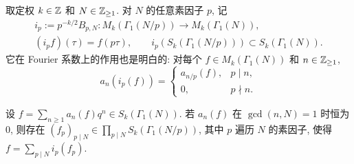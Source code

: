取定权 $k \in \mathbb{Z}$ 和 $N \in \mathbb{Z}_{\geq 1}$. 对 $N$ 的任意素因子 $p$, 记
\begin{gather*}
	i_p := p^{-k/2} B_{p,N}: M_k(\Gamma_1(N/p)) \to M_k(\Gamma_1(N)), \\
	(i_p f)(\tau) = f(p\tau), \qquad i_p\left( S_k(\Gamma_1(N/p)) \right) \subset S_k(\Gamma_1(N)).
\end{gather*}
它在 Fourier 系数上的作用也是明白的: 对每个 $f \in M_k(\Gamma_1(N))$ 和 $n \in \mathbb{Z}_{\geq 1}$,
\[ a_n(i_p(f)) = \begin{cases} a_{n/p}(f), & p \mid n, \\ 0, & p \nmid n. \end{cases} \]

\begin{theorem}\label{prop:oldform-decomp}
	设 $f = \sum_{n \geq 1} a_n(f) q^n \in S_k(\Gamma_1(N))$. 若 $a_n(f)$ 在 $\gcd(n, N) = 1$ 时恒为 $0$, 则存在 $(f_p)_{p \mid N} \in \prod_{p \mid N} S_k(\Gamma_1(N/p))$, 其中 $p$ 遍历 $N$ 的素因子, 使得 $f = \sum_{p \mid N} i_p (f_p)$.
\end{theorem}
